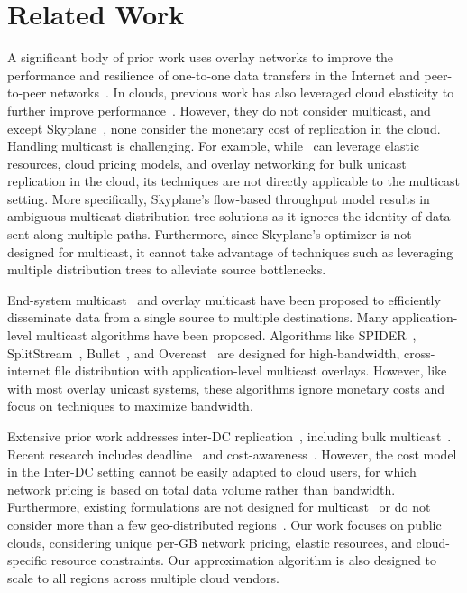 \section{Related Work}

 A significant body of prior work uses overlay networks to improve the performance and resilience of one-to-one data transfers in the Internet and peer-to-peer networks~\cite{andersen2001resilient, kostic2003bullet, castro2003splitstream}.
In clouds, previous work has also leveraged cloud elasticity to further improve performance~\cite{matos2009clon, jain2022skyplane}.
However, they do not consider multicast, and except Skyplane~\cite{jain2022skyplane}, none consider the monetary cost of replication in the cloud.
Handling multicast is challenging.
For example, while~\cite{jain2022skyplane} can leverage elastic resources, cloud pricing models, and overlay networking for bulk unicast replication in the cloud, its techniques are not directly applicable to the multicast setting.
More specifically, Skyplane's flow-based throughput model results in ambiguous multicast distribution tree solutions as it ignores the identity of data sent along multiple paths.
Furthermore, since Skyplane's optimizer is not designed for multicast, it cannot take advantage of techniques such as leveraging multiple distribution trees to alleviate source bottlenecks. 

End-system multicast~\cite{chu2002case} and overlay multicast have been proposed to efficiently disseminate data from a single source to multiple destinations. 
Many application-level multicast algorithms have been proposed. 
Algorithms like SPIDER~\cite{ganguly2005fast}, SplitStream~\cite{castro2003splitstream}, Bullet~\cite{kostic2003bullet}, and Overcast~\cite{jannotti2000overcast} are designed for high-bandwidth, cross-internet file distribution with application-level multicast overlays.
However, 
like with most overlay unicast systems, 
these algorithms ignore monetary costs and focus on techniques to maximize bandwidth. 

Extensive prior work addresses inter-DC replication~\cite{sima2022ekko, flinn2022owl, zhang2018bds, laoutaris2011inter, feng2012jetway}, including bulk multicast~\cite{luo2019deadline}. Recent research includes deadline~\cite{luo2019deadline} and cost-awareness~\cite{fatemipour2022cost, feng2012jetway}. However, the cost model in the Inter-DC setting cannot be easily adapted to cloud users, for which network pricing is based on total data volume rather than bandwidth.  Furthermore, existing formulations are not designed for multicast~\cite{fatemipour2022cost, feng2012jetway} or do not consider more than a few geo-distributed regions~\cite{luo2019deadline}.  Our work focuses on public clouds, considering unique per-GB network pricing, elastic resources, and cloud-specific resource constraints.  Our approximation algorithm is also designed to scale to all regions across multiple cloud vendors.

